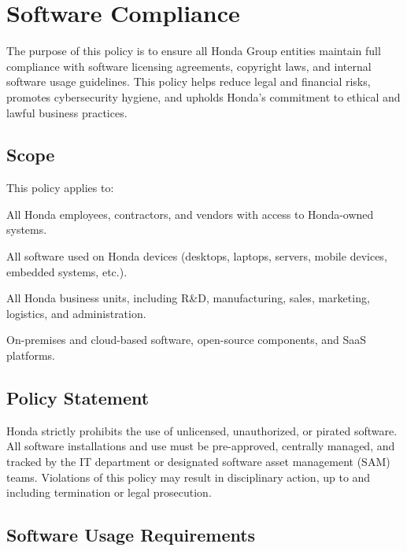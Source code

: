 \chapter{Software Compliance}
\pagestyle{fancy}

\fancyhf{}

\fancyfoot[C]{\thepage}

\renewcommand{\headrulewidth}{0pt}
\renewcommand{\footrulewidth}{0pt}


The purpose of this policy is to ensure all Honda Group entities maintain full compliance with software licensing agreements, copyright laws, and internal software usage guidelines. This policy helps reduce legal and financial risks, promotes cybersecurity hygiene, and upholds Honda’s commitment to ethical and lawful 
business practices. 

\section{Scope}

This policy applies to:

All Honda employees, contractors, and vendors with access to Honda-owned systems.

All software used on Honda devices (desktops, laptops, servers, mobile devices, embedded systems, etc.).

All Honda business units, including R\&D, manufacturing, sales, marketing, logistics, and administration.

On-premises and cloud-based software, open-source components, and SaaS platforms.

\section{Policy Statement}

Honda strictly prohibits the use of unlicensed, unauthorized, or pirated software. All software installations and use must be pre-approved, centrally managed, and tracked by the IT department or designated software asset management (SAM) teams. Violations of this policy may result in disciplinary action, up to and including termination or legal prosecution.

\section{Software Usage Requirements}

